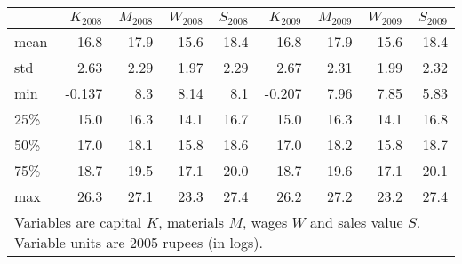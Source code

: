 \begin{tabular}{lrrrrrrrr}
\toprule
{} &  $K_{2008}$ &  $M_{2008}$ &  $W_{2008}$ &  $S_{2008}$ &  $K_{2009}$ &  $M_{2009}$ &  $W_{2009}$ &  $S_{2009}$ \\
\midrule
mean &        16.8 &        17.9 &        15.6 &        18.4 &        16.8 &        17.9 &        15.6 &        18.4 \\
std  &        2.63 &        2.29 &        1.97 &        2.29 &        2.67 &        2.31 &        1.99 &        2.32 \\
min  &      -0.137 &         8.3 &        8.14 &         8.1 &      -0.207 &        7.96 &        7.85 &        5.83 \\
25\%  &        15.0 &        16.3 &        14.1 &        16.7 &        15.0 &        16.3 &        14.1 &        16.8 \\
50\%  &        17.0 &        18.1 &        15.8 &        18.6 &        17.0 &        18.2 &        15.8 &        18.7 \\
75\%  &        18.7 &        19.5 &        17.1 &        20.0 &        18.7 &        19.6 &        17.1 &        20.1 \\
max  &        26.3 &        27.1 &        23.3 &        27.4 &        26.2 &        27.2 &        23.2 &        27.4 \\
\bottomrule
\multicolumn{9}{p{.8\textwidth}}{{\scriptsize Variables are capital $K$, materials $M$, wages $W$ and sales value $S$. Variable units are 2005 rupees (in logs).}}
\end{tabular}
